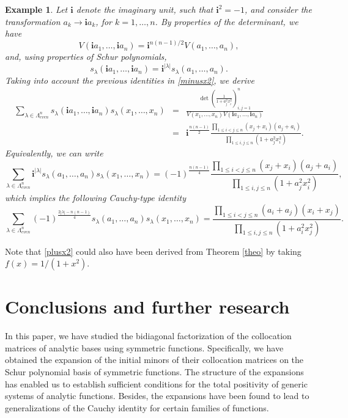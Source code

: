 \documentclass[smallextended]{svjour3}       %
\newtheorem{exmp}{Example}
\begin{document}
\begin{exmp}
Let  \(\mathbf{i} \) denote the imaginary unit, such that \(\mathbf{i}^2= -1\), and 
consider the transformation \(a_k\longrightarrow \mathbf{i} a_k\), for \(k=1,\dots, n\). By properties of the determinant, we have 
\[
 V( \mathbf{i} a_1,\dots, \mathbf{i}a_n) =\mathbf{i} ^{n(n-1)/2}  V( a_1,\dots,a_n),   
\]
and, using properties of Schur polynomials, 
\[
s_\lambda(\mathbf{i} a_1,\dots,\mathbf{i} a_n)= \mathbf{i} ^{|\lambda|} s_\lambda(a_1,\dots, a_n).
\]
Taking into account the previous identities in  \eqref{minusx2}, we derive 
 \begin{eqnarray*}
      \sum_{\lambda \in \Lambda^n_{even}}  s_\lambda( \mathbf{i}  a_1,\dots,  \mathbf{i} a_n)s_\lambda(x_1,\dots,x_n)&=&  
      \frac{  \det\left( \frac{1}{1+a^2_jx^2_i}\right)_{i,j=1}^n}{  
      V( x_1,\dots,x_n)  V( \mathbf{i}a_1,\dots,\mathbf{i}a_n)}\\ 
      &=& \mathbf{i}^{\frac{n(n-1)}{2} } \frac{  \prod_{1\le i< j \le n} (x_j+x_i) (a_j+a_i) } { \prod_{1\le i , j \le n} (1+a_j^2x_i^2)}. 
  \end{eqnarray*}
Equivalently, we can write
 \[
      \sum_{\lambda \in \Lambda^n_{even}}  \mathbf{i} ^{|\lambda|}  s_\lambda( a_1,\dots, a_n)s_\lambda(x_1,\dots,x_n)=  
     (-1)^{\frac{n(n-1)}{4} } \frac{  \prod_{1\le i< j \le n} (x_j+x_i) (a_j+a_i) } { \prod_{1\le i , j \le n} (1+a_j^2x_i^2)},
 \]
which implies the following Cauchy-type identity
\begin{equation}\label{plusx2}
      \sum_{\lambda \in \Lambda^n_{even}}  (-1)^{\frac{2 |\lambda|-n(n-1)}{4}}s_\lambda(a_1,\dots,a_n)s_\lambda(x_1,\dots,x_n)  =\frac{ \prod_{1\le i < j\le n}(a_i+a_j)(x_i+x_j)}{\prod_{1\le i,j\le n}(1+a^2_ix^2_j)}.
\end{equation}
\end{exmp}
 Note that \eqref{plusx2} could also have been derived from Theorem \ref{theo} by taking  $f(x)=1/(1+x^2)$.


 

\section{Conclusions and further research}\label{sec:conclusions}
In this paper, we have studied the bidiagonal factorization of the collocation matrices of analytic bases using symmetric functions. Specifically, we have obtained the expansion of the initial minors of their collocation matrices on the Schur polynomial basis of symmetric functions. The structure of the expansions has enabled us to establish sufficient conditions for the total positivity of generic systems of analytic functions. Besides, the expansions have been found to lead to generalizations of the Cauchy identity for certain families of functions.  
\end{document}
